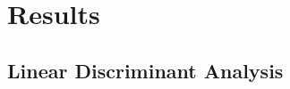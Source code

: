 \documentclass[12pt, letterpaper]{article}
\begin{document}

\section{Results} \label{sec:Results}

\subsection{Linear Discriminant Analysis} \label{sec:LDAResults}


\end{document}
